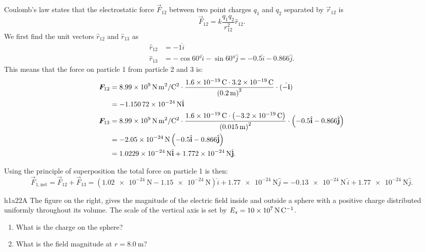   \begin{derivation}
    Coulomb's law states that the electrostatic force $\Vec{F}_{12}$ between two point charges $q_1$ and $q_2$ separated by $\Vec{r}_{12}$ is
    \begin{equation*}
      \Vec{F}_{12} = k \frac{q_1 q_2}{r_{12}^2} \hat{r}_{12}
    .\end{equation*}
    We first find the unit vectors $\hat{r}_{12}$ and $\hat{r}_{13}$ as
    \begin{align*}
      \hat{r}_{12} &= -1 \hat{i} \\
      \hat{r}_{13} &= -\cos \ang{60} \hat{i} - \sin \ang{60} \hat{j} = -\num{0,5} \hat{i} - \num{0,866}  \hat{j}
    .\end{align*}
    This means that the force on particle 1 from particle 2 and 3 is:
    \begin{align*}
      \Vec{F}_{12} &= \qty{8,99e9}{\N.\m^2\per\C^2} \cdot \frac{\qty{1,6e-19}{\C} \cdot \qty{3,2e-19}{\C}}{\left( \qty{0,2}{\m}  \right)^2} \cdot (\hat{-i}) \\
      &= - \qty{1,15072e-24}{\N} \hat{i} \\
      \Vec{F}_{13} &= \qty{8,99e9}{\N.\m^2\per\C^2} \cdot \frac{\qty{1,6e-19}{\C} \cdot \left( - \qty{3,2e-19}{\C} \right)}{\left( \qty{0,015}{\m}  \right)^2} \cdot \left( \num{-0,5} \hat{i} - \num{0,866} \hat{j} \right)  \\
      &= -\qty{2,05e-24}{\N} \left( \num{-0,5} \hat{i} - \num{0,866} \hat{j} \right) \\
      &= \qty{1,0229e-24}{\N} \hat{i} + \qty{1,772e-24}{\N} \hat{j}
    .\end{align*}

    Using the principle of superposition the total force on particle 1 is then:
    \begin{equation*}
      \Vec{F}_{1, \mathrm{net}} = \Vec{F}_{12} + \Vec{F}_{13} = \left( \qty{1,02e-24}{\N} - \qty{1,15e-24}{\N}  \right) \hat{i} + \qty{1,77e-24}{\N} \hat{j} = -\qty{0,13e-24}{\N} \, \hat{i} + \qty{1,77e-24}{\N} \hat{j}
    .\end{equation*}
  \end{derivation}


  \begin{problemwithimage}{h1a2}{2A}
    The figure on the right, gives the magnitude of the electric field inside and outside a sphere with a positive charge distributed uniformly throughout its volume.
    The scale of the vertical axis is set by $E_s = \qty{10e7}{\N\per\C}$.

    \begin{enumerate}
      \item What is the charge on the sphere?
      \item What is the field magnitude at $r = \qty{8,0}{\m}$?
    \end{enumerate}
  \end{problemwithimage}

